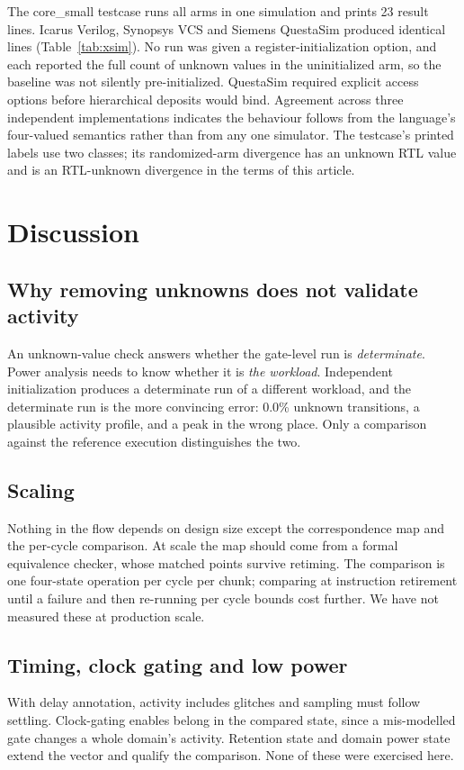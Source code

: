 \documentclass[journal]{IEEEtran}
\begin{document}
The core\_small testcase runs all arms in one simulation and prints 23 result lines.
Icarus Verilog, Synopsys VCS and Siemens QuestaSim produced identical lines
(Table~\ref{tab:xsim}). No run was given a register-initialization option, and each
reported the full count of unknown values in the uninitialized arm, so the baseline
was not silently pre-initialized. QuestaSim required explicit access options before
hierarchical deposits would bind. Agreement across three independent
implementations indicates the behaviour follows from the language's four-valued
semantics rather than from any one simulator. The testcase's printed labels use two
classes; its randomized-arm divergence has an unknown RTL value and is an
RTL-unknown divergence in the terms of this article.

\section{Discussion}

\subsection{Why removing unknowns does not validate activity}
An unknown-value check answers whether the gate-level run is \emph{determinate}.
Power analysis needs to know whether it is \emph{the workload}. Independent
initialization produces a determinate run of a different workload, and the
determinate run is the more convincing error: 0.0\% unknown transitions, a plausible
activity profile, and a peak in the wrong place. Only a comparison against the
reference execution distinguishes the two.

\subsection{Scaling}
Nothing in the flow depends on design size except the correspondence map and the
per-cycle comparison. At scale the map should come from a formal equivalence
checker, whose matched points survive retiming. The comparison is one four-state
operation per cycle per chunk; comparing at instruction retirement until a failure
and then re-running per cycle bounds cost further. We have not measured these at
production scale.

\subsection{Timing, clock gating and low power}
With delay annotation, activity includes glitches and sampling must follow
settling. Clock-gating enables belong in the compared state, since a mis-modelled
gate changes a whole domain's activity. Retention state and domain power state
extend the vector and qualify the comparison. None of these were exercised here.
\end{document}
